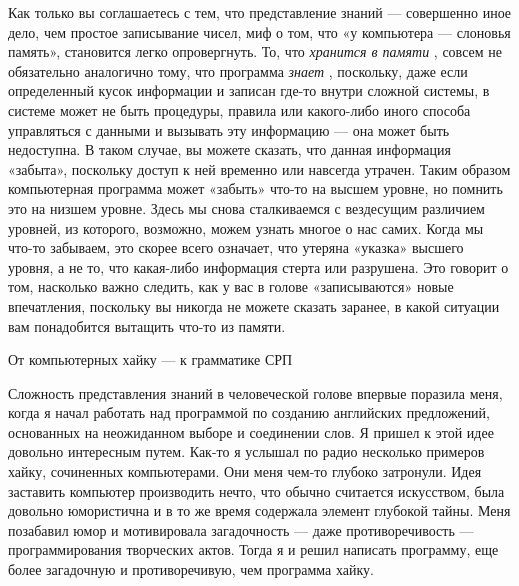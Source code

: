 Как только вы соглашаетесь с тем, что представление знаний --- совершенно иное дело, чем простое записывание чисел, миф о том, что «у компьютера --- слоновья память», становится легко опровергнуть. То, что \emph{хранится в памяти} , совсем не обязательно аналогично тому, что программа \emph{знает} , поскольку, даже если определенный кусок информации и записан где-то внутри сложной системы, в системе может не быть процедуры, правила или какого-либо иного способа управляться с данными и вызывать эту информацию --- она может быть недоступна. В таком случае, вы можете сказать, что данная информация «забыта», поскольку доступ к ней временно или навсегда утрачен. Таким образом компьютерная программа может «забыть» что-то на высшем уровне, но помнить это на низшем уровне. Здесь мы снова сталкиваемся с вездесущим различием уровней, из которого, возможно, можем узнать многое о нас самих. Когда мы что-то забываем, это скорее всего означает, что утеряна «указка» высшего уровня, а не то, что какая-либо информация стерта или разрушена. Это говорит о том, насколько важно следить, как у вас в голове «записываются» новые впечатления, поскольку вы никогда не можете сказать заранее, в какой ситуации вам понадобится вытащить что-то из памяти.

От компьютерных хайку --- к грамматике СРП

Сложность представления знаний в человеческой голове впервые поразила меня, когда я начал работать над программой по созданию английских предложений, основанных на неожиданном выборе и соединении слов. Я пришел к этой идее довольно интересным путем. Как-то я услышал по радио несколько примеров хайку, сочиненных компьютерами. Они меня чем-то глубоко затронули. Идея заставить компьютер производить нечто, что обычно считается искусством, была довольно юмористична и в то же время содержала элемент глубокой тайны. Меня позабавил юмор и мотивировала загадочность --- даже противоречивость --- программирования творческих актов. Тогда я и решил написать программу, еще более загадочную и противоречивую, чем программа хайку.

